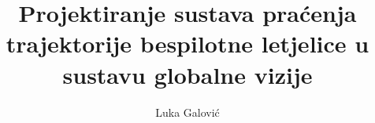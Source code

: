 \documentclass[times, utf8, diplomski]{fer}
\begin{document}

\title{Projektiranje sustava praćenja trajektorije bespilotne letjelice u sustavu globalne vizije}

\author{Luka Galović}

\maketitle




\tableofcontents
\listoffigures
\end{document}
